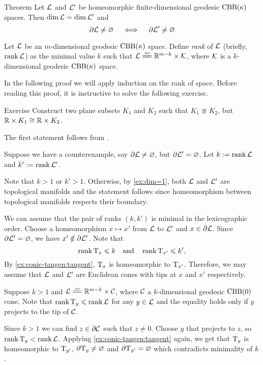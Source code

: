 \begin{thm}{Theorem}
Let $\mathcal{L}$ and $\mathcal{L}'$ be homeomorphic finite-dimensional geodesic $\mathrm{CBB}(\kappa)$ spaces.
Then $\operatorname{\rm dim}\nolimits \mathcal{L}=\operatorname{\rm dim}\nolimits\mathcal{L}'$ and
\[\partial\mathcal{L}\ne \varnothing
\quad\iff\quad
\partial\mathcal{L}'\ne \varnothing
\]
\end{thm}

Let $\mathcal{L}$ be an $m$-dimensional geodesic $\mathrm{CBB}(\kappa)$ space.
Define \emph{rank} of $\mathcal{L}$ (briefly, $\operatorname{\rm rank}\nolimits\mathcal{L}$) as the minimal value $k$ such that $\spc{L}\iso\RR^{m-k}\times \spc{K}$,
where $\mathcal{K}$ is a $k$-dimensional geodesic $\mathrm{CBB}(\kappa)$ space.

In the following proof we will apply induction on the rank of space.
Before reading this proof, it is instructive to solve the following exercise.

\begin{thm}{Exercise}
Construct two plane subsets $K_1$ and $K_2$ such that $K_1\ncong K_2$,
but $\mathbb{R}\times K_1\cong \mathbb{R}\times K_2$.
\end{thm}

The first statement follows from .

Suppose we have a counterexample, say $\partial \mathcal{L}\ne \varnothing$, but $\partial \mathcal{L}'=\varnothing$.
Let $k\mathrel{:=}\operatorname{\rm rank}\nolimits \mathcal{L}$ and $k'\mathrel{:=}\operatorname{\rm rank}\nolimits \mathcal{L}'$.

Note that $k>1$ or $k'>1$.
Otherwise, by \ref{ex:dim=1}, both $\mathcal{L}$ and $\mathcal{L}'$ are topological manifolds
and the statement follows since homeomorphism between topological manifolds respects their boundary.

We can assume that the pair of ranks $(k,k')$ is minimal in the lexicographic order.
Choose a homeomorphism $x\mapsto x'$ from $\mathcal{L}$ to $\mathcal{L}'$ 
and $x\in \partial \mathcal{L}$.
Since $\partial \mathcal{L}'=\varnothing$, we have $x'\notin \partial \mathcal{L}'$.
Note that 
\[\operatorname{\rm rank}\nolimits \mathrm{T}_x\leqslant k
\quad\text{and}\quad
\operatorname{\rm rank}\nolimits \mathrm{T}_{x'}\leqslant k',
\]
By \ref{ex:conic-tangen:tangent}, $\mathrm{T}_x$ is homeomorphic to $\mathrm{T}_{x'}$.
Therefore, we may assume that $\mathcal{L}$ and $\mathcal{L}'$ are Euclidean cones with tips at $x$ and $x'$ respectively.


Suppose $k>1$ and $\spc{L}\iso \RR^{m-k}\times \spc{C}$, where $\mathcal{C}$ a $k$-dimensional geodesic $\mathrm{CBB}(0)$ cone.
Note that $\operatorname{\rm rank}\nolimits\mathrm{T}_y\leqslant\operatorname{\rm rank}\nolimits\mathcal{L}$ for any $y\in\mathcal{L}$ and the equality holds only if $y$ projects to the tip of $\mathcal{C}$.

Since $k>1$ we can find $z\in\partial\mathcal{C}$ such that $z\ne 0$.
Choose $y$ that projects to $z$, so $\operatorname{\rm rank}\nolimits\mathrm{T}_y<\operatorname{\rm rank}\nolimits\mathcal{L}$.
Applying \ref{ex:conic-tangen:tangent} again, we get that $\mathrm{T}_y$ is homeomorphic to $\mathrm{T}_{y'}$,
$\partial  \mathrm{T}_y\ne\varnothing$ and $\partial \mathrm{T}_{y'}=\varnothing$ which contradicts minimality of $k$.

